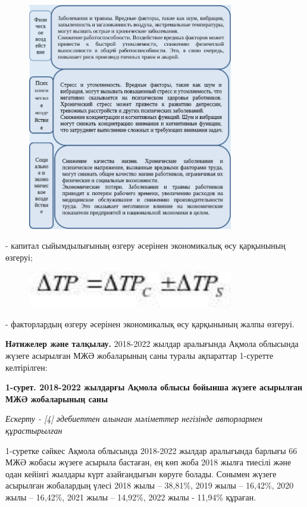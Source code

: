 \begin{figure}[H]
	\centering
	\includegraphics[width=0.8\textwidth]{assets/342}
	\caption*{}
\end{figure}- капитал сыйымдылығының өзгеру
әсерінен экономикалық өсу қарқынының өзгеруі;

\begin{figure}[H]
	\centering
	\includegraphics[width=0.8\textwidth]{assets/343}
	\caption*{}
\end{figure}- факторлардың өзгеру әсерінен
экономикалық өсу қарқынының жалпы өзгеруі.

{\bfseries Нәтижелер және талқылау.} 2018-2022 жылдар аралығында Ақмола
облысында жүзеге асырылған МЖӘ жобаларының саны туралы ақпараттар
1-суретте келтірілген:

{\bfseries 1-сурет. 2018-2022 жылдарғы Ақмола облысы бойынша жүзеге
асырылған МЖӘ жобаларының саны}

\emph{Ескерту - {[}4{]} әдебиеттен алынған мәліметтер негізінде
авторлармен құрастырылған}

1-суретке сәйкес Ақмола облысында 2018-2022 жылдар аралығында барлығы 66
МЖӘ жобасы жүзеге асырыла бастаған, ең көп жоба 2018 жылға тиесілі және
одан кейінгі жылдары күрт азайғандығын көруге болады. Сонымен жүзеге
асырылған жобалардың үлесі 2018 жылы -- 38,81\%, 2019 жылы -- 16,42\%,
2020 жылы -- 16,42\%, 2021 жылы -- 14,92\%, 2022 жылы - 11,94\% құраған.

